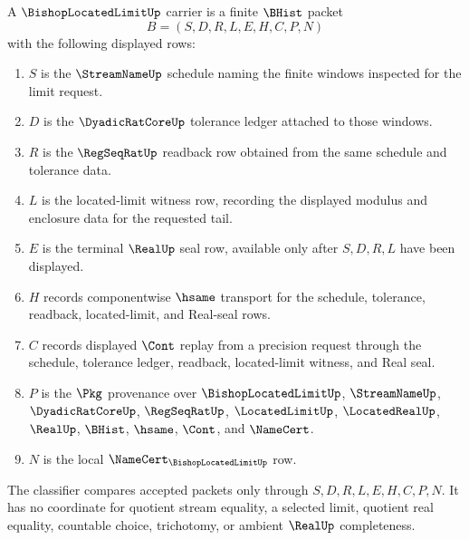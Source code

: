 \begin{definition}
\label{def:bishop-located-limit-carrier}
A $\BishopLocatedLimitUp$ carrier is a finite $\BHist$ packet
$$
B=(S,D,R,L,E,H,C,P,N)
$$
with the following displayed rows:
\begin{enumerate}
\item $S$ is the $\StreamNameUp$ schedule naming the finite windows inspected for the limit request.
\item $D$ is the $\DyadicRatCoreUp$ tolerance ledger attached to those windows.
\item $R$ is the $\RegSeqRatUp$ readback row obtained from the same schedule and tolerance data.
\item $L$ is the located-limit witness row, recording the displayed modulus and enclosure data for the requested tail.
\item $E$ is the terminal $\RealUp$ seal row, available only after $S,D,R,L$ have been displayed.
\item $H$ records componentwise $\hsame$ transport for the schedule, tolerance, readback, located-limit, and Real-seal rows.
\item $C$ records displayed $\Cont$ replay from a precision request through the schedule, tolerance ledger, readback, located-limit witness, and Real seal.
\item $P$ is the $\Pkg$ provenance over $\BishopLocatedLimitUp$, $\StreamNameUp$, $\DyadicRatCoreUp$, $\RegSeqRatUp$, $\LocatedLimitUp$, $\LocatedRealUp$, $\RealUp$, $\BHist$, $\hsame$, $\Cont$, and $\NameCert$.
\item $N$ is the local $\NameCert_{\BishopLocatedLimitUp}$ row.
\end{enumerate}
The classifier compares accepted packets only through $S,D,R,L,E,H,C,P,N$. It has no coordinate for quotient stream equality, a selected limit, quotient real equality, countable choice, trichotomy, or ambient $\RealUp$ completeness.
\end{definition}

